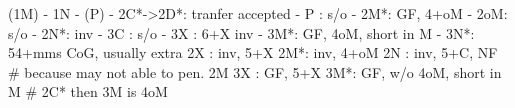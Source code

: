 (1M) - 1N - (P) - 
2C*->2D*: tranfer accepted
        - P  : s/o
        - 2M*: GF, 4+oM
        - 2oM: s/o
        - 2N*: inv
        - 3C : s/o
        - 3X : 6+X inv
        - 3M*: GF, 4oM, short in M
        - 3N*: 54+mms CoG, usually extra
2X : inv, 5+X
2M*: inv, 4+oM
2N : inv, 5+C, NF  # because may not able to pen. 2M
3X : GF, 5+X
3M*: GF, w/o 4oM, short in M  # 2C* then 3M is 4oM